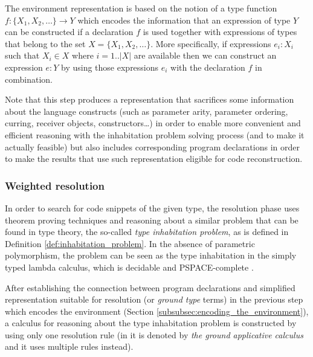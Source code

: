 The environment representation is based on the notion of a type function $f: \{X_1, X_2,\ldots\} \rightarrow Y$ which encodes the information that an expression of type $Y$ can be constructed if a declaration $f$ is used together with expressions of types that belong to the set $X =\{X_1, X_2,\ldots\}$.
More specifically, if expressions $e_i: X_i$ such that $X_i \in X$ where $i=1..|X|$ are available then we can construct an expression $e:Y$ by using those expressions $e_i$ with the declaration $f$ in combination. 

Note that this step produces a representation that sacrifices some information about the language constructs (such as parameter arity, parameter ordering, curring, receiver objects, constructors\ldots) in order to enable more convenient and efficient reasoning with the inhabitation problem solving process (and to make it actually feasible) but also includes corresponding program declarations in order to make the results that use such representation eligible for code reconstruction.

\subsubsection{Weighted resolution}

In order to search for code snippets of the given type, the resolution phase uses theorem proving techniques and reasoning about a similar problem that can be found in type theory, the so-called \textit{type inhabitation problem}, as is defined in Definition \ref{def:inhabitation_problem}.
In the absence of parametric polymorphism, the problem can be seen as the type inhabitation in the simply typed lambda calculus, which is decidable and PSPACE-complete \cite{Urzyczyn:1997:ITL:645893.671612}.

After establishing the connection between program declarations and simplified representation suitable for resolution (or \textit{ground type} terms) in the previous step which encodes the environment (Section \ref{subsubsec:encoding_the_environment}), a calculus for reasoning about the type inhabitation problem is constructed by using only one resolution rule (in  \cite{EPFL-REPORT-170040} it is denoted by \textit{the ground applicative calculus} and it uses multiple rules instead).

